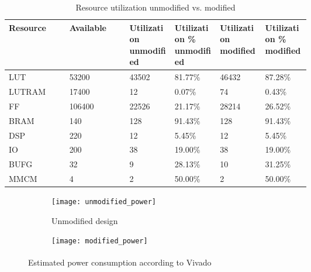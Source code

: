\documentclass[../bachelor_paper.tex]{subfiles}
\begin{document}
\begin{table}
    \centering
    \begin{tabular}{llp{0.15\linewidth}p{0.15\linewidth}p{0.15\linewidth}p{0.15\linewidth}}
    \textbf{Resource}   & \textbf{Available}    & \textbf{Utilization unmodified} & \textbf{Utilization \% unmodified}  & \textbf{Utilization modified}   & \textbf{Utilization \% modified}\\
    \hline
    \acs{LUT}           & 53200                 & 43502                     & 81.77\%                       & 46432                     & 87.28\%   \\
    \acs{LUTRAM}        & 17400                 & 12                        & 0.07\%                        & 74                        & 0.43\%    \\
    \acs{FF}            & 106400                & 22526                     & 21.17\%                       & 28214                     & 26.52\%   \\
    \acs{BRAM}          & 140                   & 128                       & 91.43\%                       & 128                       & 91.43\%   \\
    \acs{DSP}           & 220                   & 12                        & 5.45\%                        & 12                        & 5.45\%    \\
    \acs{IO}            & 200                   & 38                        & 19.00\%                       & 38                        & 19.00\%   \\
    \acs{BUFG}          & 32                    & 9                         & 28.13\%                       & 10                        & 31.25\%   \\
    \acs{MMCM}          & 4                     & 2                         & 50.00\%                       & 2                         & 50.00\%   \\
    \hline
    \end{tabular}
    \caption{Resource utilization unmodified vs. modified }
    \label{tab:perf/util/data}
\end{table}

\begin{figure}
    \centering
    \begin{subfigure}{0.45\textwidth}
        \texttt{[image: unmodified\_power]}
        \caption{Unmodified design}
        \label{fig:perf/power/split/unmod}
    \end{subfigure}
    \hfil
    \begin{subfigure}{0.45\textwidth}
        \texttt{[image: modified\_power]}
        \label{fig:perf/power/split/mod}
    \end{subfigure}
    \caption{Estimated power consumption according to Vivado\textsuperscript{\textregistered}}
    \label{fig:perf/power/split}
\end{figure}

\isstandalone



\fi
\end{document}
